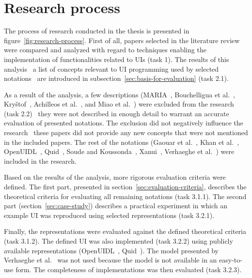 \section{Research process}\label{sec:research-process}

The process of research conducted in the thesis is presented in figure~\ref{fig:research-process}.
First of all, papers selected in the literature review were compared and analyzed with regard to techniques enabling the implementation of functionalities related to UIs (task 1).
The results of this analysis \textendash\ a list of concepts relevant to UI programming used by selected notations \textendash\ are introduced in subsection~\ref{sec:basis-for-evaluation} (task 2.1).

As a result of the analysis, a few descriptions (MARIA~\cite{Paterno2009, MariaPDF}, Bouchelligua et al.~\cite{Bouchelligua2010}, Kryštof~\cite{kryvstof2010lpgm}, Achilleos et al.~\cite{Achilleos2011}, and Miao et al.~\cite{Miao2017}) were excluded from the research (task 2.2) \textendash\ they were not described in enough detail to warrant an accurate evaluation of presented notations.
The exclusion did not negatively influence the research \textendash\ these papers did not provide any new concepts that were not mentioned in the included papers.
The rest of the notations (Gaouar et al.~\cite{Gaouar2018}, Khan et al.~\cite{Khan2021}, OpenUIDL~\cite{Moldovan2020}, Quid~\cite{molina2018quid, Molina2019}, Soude and Koussonda~\cite{Soude2022}, Xanui~\cite{hermida2016xanui}, Verhaeghe et al.~\cite{Verhaeghe2021visual, Verhaeghe2021behavior}) were included in the research.

Based on the results of the analysis, more rigorous evaluation criteria were defined.
The first part, presented in section~\ref{sec:evaluation-criteria}, describes the theoretical criteria for evaluating all remaining notations (task 3.1.1).
The second part (section~\ref{sec:case-study}) describes a practical experiment in which an example UI was reproduced using selected representations (task 3.2.1).

Finally, the representations were evaluated against the defined theoretical criteria (task 3.1.2).
The defined UI was also implemented (task 3.2.2) using publicly available representations (OpenUIDL~\cite{Moldovan2020}, Quid~\cite{molina2018quid, Molina2019}).
The model presented by Verhaeghe et al.~\cite{Verhaeghe2021visual, Verhaeghe2021behavior} was not used because the model is not available in an easy-to-use form.
The completeness of implementations was then evaluated (task 3.2.3).

